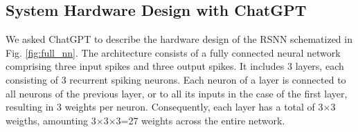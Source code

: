 \subsection{System Hardware Design with ChatGPT}

We asked ChatGPT to describe the hardware design of the RSNN schematized in Fig. \ref{fig:full_nn}.
The architecture consists of a fully connected neural network comprising three input spikes and three output spikes.
It includes 3 layers, each consisting of 3 recurrent spiking neurons. 
Each neuron of a layer is connected to all neurons of the previous layer, or to all its inputs in the case of the first layer, resulting in 3 weights per neuron. Consequently, each layer has a total of 3$\times$3 weigths, amounting 3$\times$3$\times$3=27 weights across the entire network.

